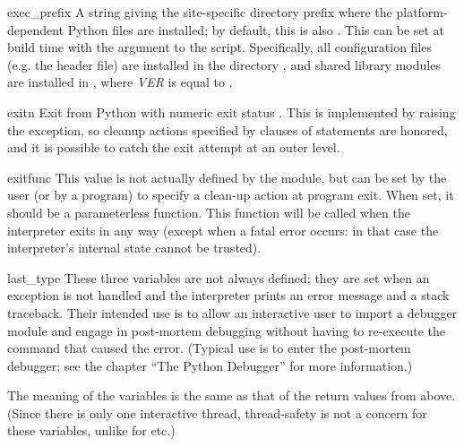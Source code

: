 \begin{datadesc}{exec_prefix}
A string giving the site-specific
directory prefix where the platform-dependent Python files are
installed; by default, this is also .  This can be
set at build time with the  argument to the
 script.  Specifically, all configuration files
(e.g. the  header file) are installed in the directory
, and shared library
modules are installed in
,
where \emph{VER} is equal to .
\end{datadesc}

\begin{funcdesc}{exit}{n}
  Exit from Python with numeric exit status .  This is
  implemented by raising the  exception, so cleanup
  actions specified by  clauses of  statements
  are honored, and it is possible to catch the exit attempt at an outer
  level.
\end{funcdesc}

\begin{datadesc}{exitfunc}
  This value is not actually defined by the module, but can be set by
  the user (or by a program) to specify a clean-up action at program
  exit.  When set, it should be a parameterless function.  This function
  will be called when the interpreter exits in any way (except when a
  fatal error occurs: in that case the interpreter's internal state
  cannot be trusted).
\end{datadesc}

\begin{datadesc}{last_type}
These three variables are not always defined; they are set when an
exception is not handled and the interpreter prints an error message
and a stack traceback.  Their intended use is to allow an interactive
user to import a debugger module and engage in post-mortem debugging
without having to re-execute the command that caused the error.
(Typical use is  to enter the post-mortem
debugger; see the chapter ``The Python Debugger'' for more
information.)

The meaning of the variables is the same
as that of the return values from  above.
(Since there is only one interactive thread, thread-safety is not a
concern for these variables, unlike for  etc.)
\end{datadesc}

